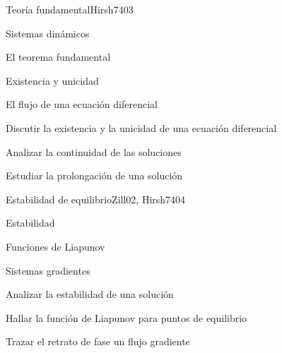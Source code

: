 \begin{syllabus}
\begin{unit}{Teoría fundamental}{Hirsh74}{0}{3}
\begin{topics}
      \item Sistemas dinámicos
      \item El teorema fundamental
      \item Existencia y unicidad
      \item El flujo de una ecuación diferencial
   \end{topics}

   \begin{learningoutcomes}
      \item Discutir la existencia y la unicidad de una ecuación diferencial
      \item Analizar la continuidad de las soluciones
      \item Estudiar la prolongación de una solución

   \end{learningoutcomes}
\end{unit}

\begin{unit}{Estabilidad de equilibrio}{Zill02, Hirsh74}{0}{4}
\begin{topics}
      \item Estabilidad
      \item Funciones de Liapunov
      \item Sistemas gradientes
   \end{topics}

   \begin{learningoutcomes}
      \item Analizar la estabilidad de una solución
      \item Hallar la función de Liapunov para puntos de  equilibrio
      \item Trazar el retrato de fase un flujo gradiente
    \end{learningoutcomes}
\end{unit}



\begin{coursebibliography}
\end{coursebibliography}

\end{syllabus}
